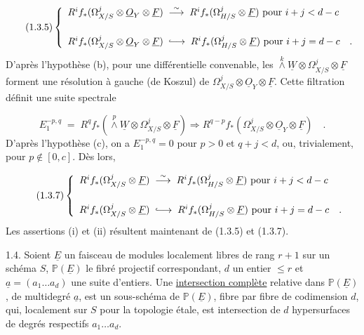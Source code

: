 \begin{equation}\tag{1.3.5}
\left\{ \begin{array}{l} R^i f_*(\Omega^j_{X/S} \otimes \underline{O}_Y \otimes \underline{F}) \; \stackrel{\sim}{\longrightarrow} \; R^i f_*(\Omega^j_{H/S} \otimes \underline{F}) \mbox{ pour } i+j < d-c \\[4ex] R^i f_*(\Omega^j_{X/S} \otimes \underline{O}_Y \otimes \underline{F}) \; \lhook\joinrel\longrightarrow \; R^i f_*(\Omega^j_{H/S} \otimes \underline{F}) \mbox{ pour } i+j = d-c \quad . \end{array} \right.
\end{equation}
D'après l'hypothèse (b), pour une différentielle convenable, les $\stackrel{k}{\wedge} \underline{W} \otimes \Omega^j_{X/S} \otimes \underline{F}$ forment une résolution à gauche (de Koszul) de $\Omega^j_{X/S} \otimes \underline{O}_Y \otimes \underline{F}$. Cette filtration définit une suite spectrale

\begin{equation}\tag{1.3.6}
E_1^{-p,q} \; = \; R^q f_*( \stackrel{p}{\wedge}\underline{W} \otimes \Omega^j_{X/S} \otimes \underline{F}) \Longrightarrow R^{q-p} f_*(\Omega^j_{X/S} \otimes \underline{O}_Y \otimes \underline{F}) \quad .
\end{equation}
D'après l'hypothèse (c), on a $E_1^{-p,q} = 0$ pour $p > 0$ et $q+j < d$, ou, trivialement, pour $p \notin [0,c]$. Dès lors,

\begin{equation}\tag{1.3.7}
\left\{ \begin{array}{l} R^i f_*(\Omega^j_{X/S} \otimes \underline{F}) \; \stackrel{\sim}{\longrightarrow} \; R^i f_*(\Omega^j_{H/S} \otimes \underline{F}) \mbox{ pour } i+j < d-c \\[4ex] R^i f_*(\Omega^j_{X/S} \otimes \underline{F}) \; \lhook\joinrel\longrightarrow \; R^i f_*(\Omega^j_{H/S} \otimes \underline{F}) \mbox{ pour } i+j = d-c \quad . \end{array} \right.
\end{equation}
Les assertions (i) et (ii) résultent maintenant de (1.3.5) et (1.3.7).



1.4. Soient $\underline{E}$ un faisceau de modules localement libres de rang $r+1$ sur un schéma $S$, $\mathbb{P}(\underline{E})$ le fibré projectif correspondant, $d$ un entier $\leq r$ et $\underline{a} = (a_1 \ldots a_d)$ une suite d'entiers. Une \underline{intersection complète} relative dans $\mathbb{P}(\underline{E})$, de multidegré $\underline{a}$, est un sous-schéma de $\mathbb{P}(\underline{E})$, fibre par fibre de codimension $d$, qui, localement sur $S$ pour la topologie étale, est intersection de $d$ hypersurfaces de degrés respectifs $a_1 \ldots a_d$.

